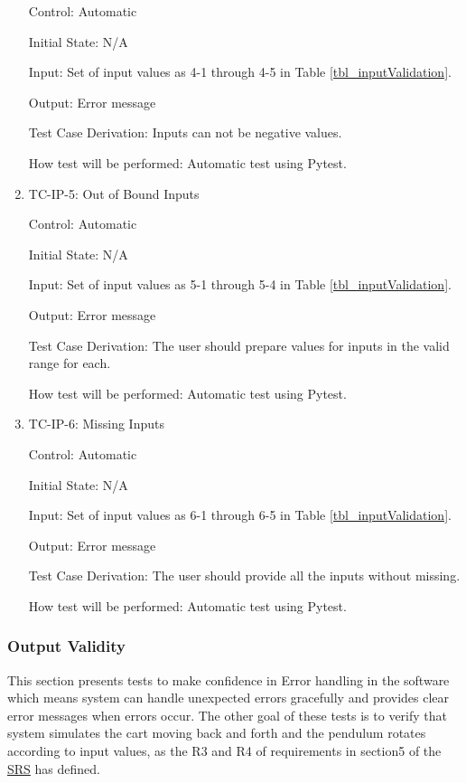 \documentclass[12pt, titlepage]{article}
\begin{document}
\begin{enumerate}
Control: Automatic
					
Initial State: N/A 
					
Input: Set of input values as 4-1 through 4-5 in Table \ref{tbl_inputValidation}.
					
Output: Error message

Test Case Derivation: Inputs can not be negative values.
					
How test will be performed: Automatic test using Pytest.

\item{TC-IP-5: Out of Bound Inputs}

Control: Automatic
					
Initial State: N/A 
					
Input: Set of input values as 5-1 through 5-4 in Table \ref{tbl_inputValidation}.
					
Output: Error message

Test Case Derivation: The user should prepare values for inputs in the valid range for each.

How test will be performed: Automatic test using Pytest.

\item{TC-IP-6: Missing Inputs}

Control: Automatic
					
Initial State: N/A 
					
Input: Set of input values as 6-1 through 6-5 in Table \ref{tbl_inputValidation}.
					
Output: Error message

Test Case Derivation: The user should provide all the inputs without missing.
					
					
How test will be performed: Automatic test using Pytest.			
				
\end{enumerate}

\subsubsection{Output Validity \label{out_val}}

This section presents tests to make confidence in Error handling in the software which means system can handle unexpected errors gracefully and provides clear error messages when errors occur.
The other goal of these tests is to verify that system simulates the cart moving back and forth and the pendulum rotates according to input values, as the R3 and R4 of requirements in section5 of the  \href{https://github.com/MinMah23/CAS741-Project/tree/main/docs/SRS/SRS.pdf}{SRS} has defined.
\end{document}
